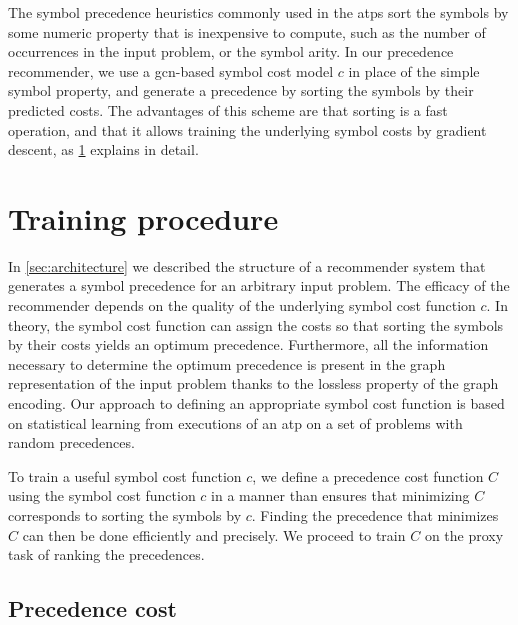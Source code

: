The symbol precedence heuristics commonly used in the \glspl{atp} sort the symbols by some numeric property
that is inexpensive to compute,
such as the number of occurrences in the input problem, or the symbol arity.
In our precedence recommender,
we use a \gls{gcn}-based symbol cost model $c$ in place of the simple symbol property,
and generate a precedence by sorting the symbols by their predicted costs.
The advantages of this scheme are that
sorting is a fast operation,
and that it allows training the underlying symbol costs by gradient descent,
as \cref{sec:training} explains in detail.


\section{Training procedure}
\label{sec:training}

In \cref{sec:architecture} we described the structure of a recommender system that generates a symbol precedence for an arbitrary input problem.
The efficacy of the recommender depends on the quality of the underlying symbol cost function $c$.
In theory, the symbol cost function can assign the costs so that
sorting the symbols by their costs yields an optimum precedence.
Furthermore, all the information necessary to determine the optimum precedence is present in the graph representation of the input problem
thanks to the lossless property of the graph encoding.
Our approach to defining an appropriate symbol cost function is based on statistical learning
from executions of an \gls{atp} on a set of problems with random precedences.

To train a useful symbol cost function $c$,
we define a precedence cost function $C$ using the symbol cost function $c$
in a manner than ensures that minimizing $C$ corresponds to sorting the symbols by $c$.
Finding the precedence that minimizes $C$ can then be done efficiently and precisely.
We proceed to train $C$ on the proxy task of ranking the precedences.


\subsection{Precedence cost}

